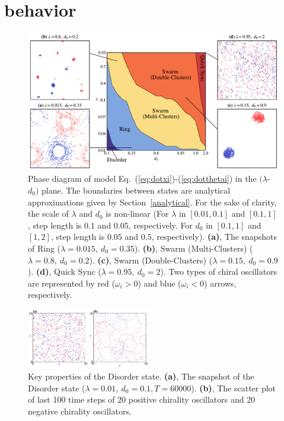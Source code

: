 \documentclass[%
 aip,
 amsmath,amssymb,
 reprint,%
]{revtex4-1}
\begin{document}
\section{behavior}

\begin{figure}
    \includegraphics[width=\textwidth]{./figs/phaseDiagram.pdf}
    \caption{
        \label{fig:phaseDiagram} Phase diagram of model Eq.~(\ref{eq:dotxi})-(\ref{eq:dotthetai}) in the $(\lambda$-$d_0)$ plane. The boundaries between states are analytical approximations given by Section~\ref{analytical}. 
        For the sake of clarity, the scale of $\lambda$ and $d_0$ is non-linear (For $\lambda$ in $\left[ 0.01, 0.1 \right]$ and $\left[ 0.1, 1 \right]$, step length is $0.1$ and $0.05$, respectively. For $d_0$ in $\left[ 0.1, 1 \right]$ and $\left[ 1, 2 \right]$, step length is $0.05$ and $0.5$, respectively).
        \textbf{(a)}, The snapshots of Ring ($\lambda=0.015,\ d_0=0.35$). 
        \textbf{(b)}, Swarm (Multi-Clusters) ($\lambda=0.8,\ d_0=0.2$).
        \textbf{(c)}, Swarm (Double-Clusters) ($\lambda=0.15,\ d_0=0.9$).
        \textbf{(d)}, Quick Sync ($\lambda=0.95,\ d_0=2$). Two types of chiral oscillators are represented by red ($\omega_i > 0$) and blue 
        ($\omega_i < 0$) arrows, respectively. 
    }
\end{figure}

\begin{figure}[b]
    \includegraphics[width=0.48\textwidth]{./figs/disorderState.pdf}
    \caption{
        \label{fig:disorderState} Key properties of the Disorder state. 
        \textbf{(a)}, The snapshot of the Disorder state ($\lambda=0.01,\ d_0=0.1, T=60000$). 
        \textbf{(b)}, The scatter plot of last 100 time steps of 20 positive chirality oscillators and 20 negative chirality oscillators.
    }
\end{figure}
\end{document}

